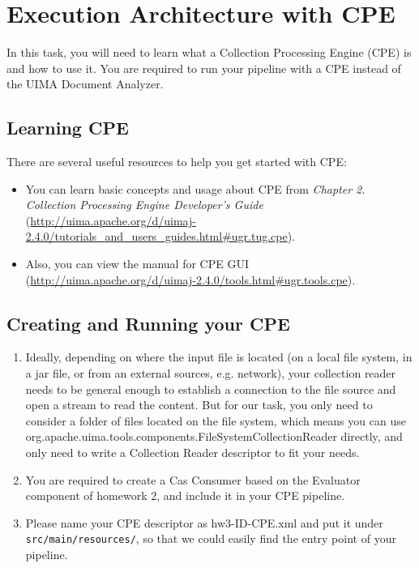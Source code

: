 
\chapter{Execution Architecture with CPE}


In this task, you will need to learn what a Collection Processing Engine (CPE) is and how to use it.
You are required to run your pipeline with a CPE instead of the UIMA Document Analyzer. 

\section{Learning CPE}

There are several useful resources to help you get started with CPE:
\begin{itemize}
  \item You can learn basic concepts and usage about CPE from 
				\emph{Chapter 2. Collection Processing Engine Developer's Guide} 
				(\url{http://uima.apache.org/d/uimaj-2.4.0/tutorials_and_users_guides.html#ugr.tug.cpe}). 
	   \item Also, you can view the manual for CPE GUI 
	   (\url{http://uima.apache.org/d/uimaj-2.4.0/tools.html#ugr.tools.cpe}).
\end{itemize}

\section{Creating and Running your CPE}

\begin{enumerate}

\item Ideally, depending on where the input file is located (on a local file
system, in a jar file, or from an external sources, e.g. network), your
collection reader needs to be general enough to establish a connection to the
file source and open a stream to read the content. But for our task, you only
need to consider a folder of files located on the file system, which means 
you can use org.apache.uima.tools.components.FileSystemCollectionReader directly, 
and only need to write a Collection Reader descriptor to fit your needs.  

\item You are required to create a Cas Consumer based on the Evaluator component of homework 2, 
and include it in your CPE pipeline.

\item Please name your CPE descriptor as hw3-ID-CPE.xml and put it
under \texttt{src/main/resources/}, so that we could easily find the entry point
of your pipeline.

 
\end{enumerate}